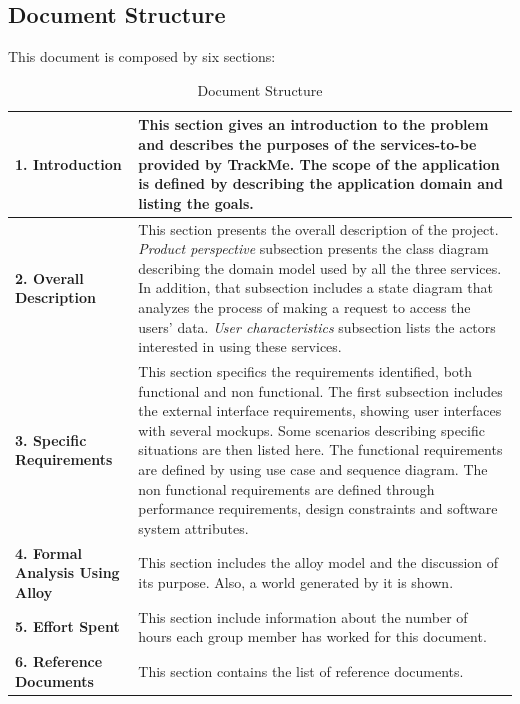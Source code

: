 \clearpage
\subsection{Document Structure}
This document is composed by six sections:

\begin{center}
\centering
\begin{table}[H]
\centering
\begin{tabular} { p{4cm}  p{10 cm} }
\toprule
\textbf{1. Introduction} & This section gives an introduction to the problem and describes the purposes of the services-to-be provided by TrackMe. The scope of the application is defined by describing the application domain and listing the goals. \\ \midrule
\textbf{2. Overall Description} & This section presents the overall description of the project. \textit{Product perspective} subsection presents the class diagram describing the domain model used by all the three services. In addition, that subsection includes a state diagram that analyzes the process of making a request to access the users' data. \textit{User characteristics} subsection lists the actors interested in using these services. \\ \midrule
\textbf{3. Specific Requirements} &  This section specifics the requirements identified, both functional and non functional. The first subsection includes the external interface requirements, showing user interfaces with several mockups. Some scenarios describing specific situations are then listed here. The functional requirements are defined by using use case and sequence diagram. The non functional requirements are defined through performance requirements, design constraints and software system attributes.  \\ \midrule
\textbf{4. Formal Analysis Using Alloy}  & This section includes the alloy model and the discussion of its purpose. Also, a world generated by it is shown. \\ \midrule
\textbf {5. Effort Spent} & This section include information about the number of hours each group member has worked for this document. \\ \midrule
\textbf{6. Reference Documents} & This section contains the list of reference documents. \\ \bottomrule
\end{tabular}
\caption{Document Structure}
\end{table}
\clearpage
\end{center}
\clearpage